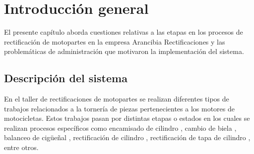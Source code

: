 
\chapter{Introducción general} %

\label{Chapter1} %
\label{IntroGeneral}


\newcommand{\keyword}[1]{\textbf{#1}}
\newcommand{\tabhead}[1]{\textbf{#1}}
\newcommand{\code}[1]{\texttt{#1}}
\newcommand{\file}[1]{\texttt{\bfseries#1}}
\newcommand{\option}[1]{\texttt{\itshape#1}}
\newcommand{\grados}{$^{\circ}$}

El presente capítulo aborda cuestiones relativas a las etapas en los procesos de rectificación de motopartes en la empresa Arancibia Rectificaciones y las problemáticas de administración que motivaron la implementación del sistema.  



\section{Descripción del sistema}

En el taller de rectificaciones de motopartes se realizan diferentes tipos de trabajos relacionados a la tornería \citep{ARTICLE:TORNERIA} de piezas pertenecientes a los motores de motocicletas. Estos trabajos pasan por distintas etapas o estados en los cuales se realizan procesos específicos como encamisado de cilindro \citep{WEBSITE:MECANICA}, cambio de biela \citep{ARTICLE:BIELA}, balanceo de cigüeñal \citep{BOOK:CIGUEÑAL}, rectificación de cilindro \citep{BOOK:MECANICA}, rectificación de tapa de cilindro \citep{BOOK:TAPA}, entre otros. 


